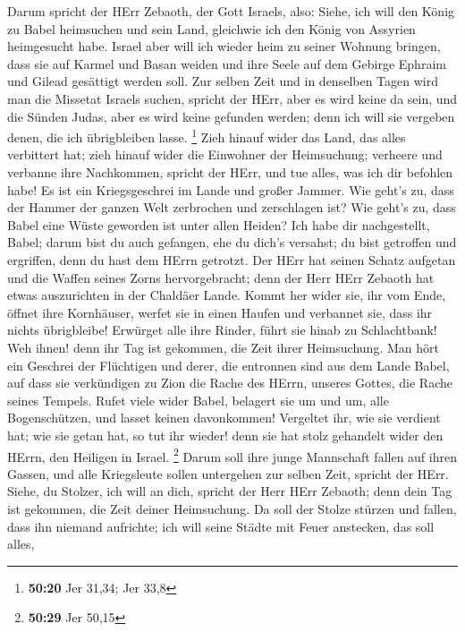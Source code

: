  Darum spricht der HErr Zebaoth, der Gott Israels, also:
Siehe, ich will den König zu Babel heimsuchen und sein Land, gleichwie
ich den König von Assyrien heimgesucht habe.  Israel aber
will ich wieder heim zu seiner Wohnung bringen, dass sie auf Karmel und
Basan weiden und ihre Seele auf dem Gebirge Ephraim und Gilead gesättigt
werden soll.  Zur selben Zeit und in denselben Tagen wird
man die Missetat Israels suchen, spricht der HErr, aber es wird keine da
sein, und die Sünden Judas, aber es wird keine gefunden werden; denn ich
will sie vergeben denen, die ich übrigbleiben lasse. \footnote{\textbf{50:20}
  Jer 31,34; Jer 33,8}  Zieh hinauf wider das Land, das
alles verbittert hat; zieh hinauf wider die Einwohner der Heimsuchung;
verheere und verbanne ihre Nachkommen, spricht der HErr, und tue alles,
was ich dir befohlen habe!  Es ist ein Kriegsgeschrei im
Lande und großer Jammer.  Wie geht's zu, dass der Hammer
der ganzen Welt zerbrochen und zerschlagen ist? Wie geht's zu, dass
Babel eine Wüste geworden ist unter allen Heiden?  Ich habe
dir nachgestellt, Babel; darum bist du auch gefangen, ehe du dich's
versahst; du bist getroffen und ergriffen, denn du hast dem HErrn
getrotzt.  Der HErr hat seinen Schatz aufgetan und die
Waffen seines Zorns hervorgebracht; denn der Herr HErr Zebaoth hat etwas
auszurichten in der Chaldäer Lande.  Kommt her wider sie,
ihr vom Ende, öffnet ihre Kornhäuser, werfet sie in einen Haufen und
verbannet sie, dass ihr nichts übrigbleibe!  Erwürget alle
ihre Rinder, führt sie hinab zu Schlachtbank! Weh ihnen! denn ihr Tag
ist gekommen, die Zeit ihrer Heimsuchung.  Man hört ein
Geschrei der Flüchtigen und derer, die entronnen sind aus dem Lande
Babel, auf dass sie verkündigen zu Zion die Rache des HErrn, unseres
Gottes, die Rache seines Tempels.  Rufet viele wider Babel,
belagert sie um und um, alle Bogenschützen, und lasset keinen
davonkommen! Vergeltet ihr, wie sie verdient hat; wie sie getan hat, so
tut ihr wieder! denn sie hat stolz gehandelt wider den HErrn, den
Heiligen in Israel. \footnote{\textbf{50:29} Jer 50,15} 
Darum soll ihre junge Mannschaft fallen auf ihren Gassen, und alle
Kriegsleute sollen untergehen zur selben Zeit, spricht der HErr.
 Siehe, du Stolzer, ich will an dich, spricht der Herr HErr
Zebaoth; denn dein Tag ist gekommen, die Zeit deiner Heimsuchung.
 Da soll der Stolze stürzen und fallen, dass ihn niemand
aufrichte; ich will seine Städte mit Feuer anstecken, das soll alles,
